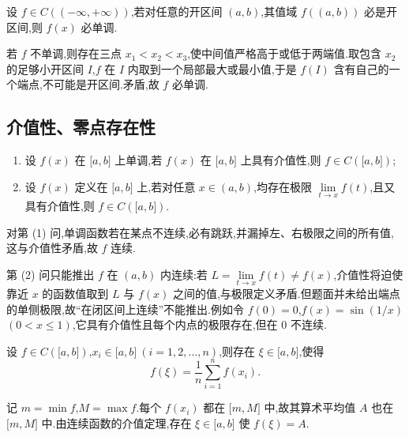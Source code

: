 \begin{example}
    设 $f\in C(( -\infty,+\infty))$,若对任意的开区间 $(a,b)$,其值域 $f((a,b))$ 必是开区间,则 $f(x)$ 必单调.
\end{example}
\exampleblank

\begin{solution}
    若 $f$ 不单调,则存在三点 $x_1<x_2<x_3$,使中间值严格高于或低于两端值.取包含 $x_2$ 的足够小开区间 $I$,$f$ 在 $I$ 内取到一个局部最大或最小值,于是 $f(I)$ 含有自己的一个端点,不可能是开区间.矛盾,故 $f$ 必单调.
\end{solution}



\subsection{介值性、零点存在性}

\begin{example}
    \begin{enumerate}
        \item 设 $f(x)$ 在 $\lbrack a,b\rbrack$ 上单调,若 $f(x)$ 在 $\lbrack a,b\rbrack$ 上具有介值性,则 $f\in C(\lbrack a,b\rbrack)$;
        \item 设 $f(x)$ 定义在 $\lbrack a,b\rbrack$ 上,若对任意 $x\in(a,b)$,均存在极限 $\displaystyle\lim\limits_{t\to x}f(t)$,且又具有介值性,则 $f\in C(\lbrack a,b\rbrack)$.
    \end{enumerate}
\end{example}
\exampleblank

\begin{solution}
    对第 (1) 问,单调函数若在某点不连续,必有跳跃,并漏掉左、右极限之间的所有值,这与介值性矛盾,故 $f$ 连续.

    第 (2) 问只能推出 $f$ 在 $(a,b)$ 内连续:若 $L=\lim\limits_{t\to x}f(t)\ne f(x)$,介值性将迫使靠近 $x$ 的函数值取到 $L$ 与 $f(x)$ 之间的值,与极限定义矛盾.但题面并未给出端点的单侧极限,故“在闭区间上连续”不能推出.例如令 $f(0)=0$,$f(x)=\sin(1/x)$ $(0<x\leq1)$,它具有介值性且每个内点的极限存在,但在 $0$ 不连续.
\end{solution}

\begin{example}
    设 $f\in C(\lbrack a,b\rbrack)$,$x_i\in\lbrack a,b\rbrack\ (i=1,2,\ldots,n)$,则存在 $\xi\in\lbrack a,b\rbrack$,使得
    \[
        f(\xi)=\dfrac{1}{n}\sum\limits_{i=1}^n f(x_i).
    \]
\end{example}
\exampleblank

\begin{solution}
    记 $m=\min f$,$M=\max f$.每个 $f(x_i)$ 都在 $\lbrack m,M\rbrack$ 中,故其算术平均值 $A$ 也在 $\lbrack m,M\rbrack$ 中.由连续函数的介值定理,存在 $\xi\in\lbrack a,b\rbrack$ 使 $f(\xi)=A$.
\end{solution}

